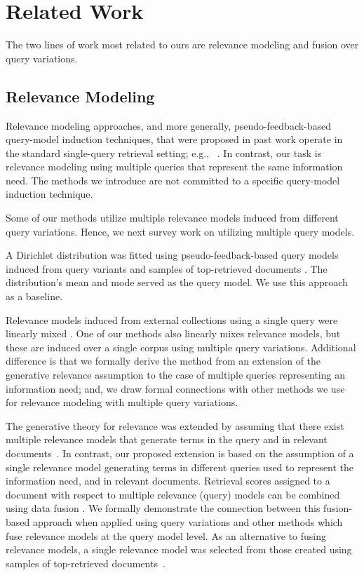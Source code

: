 \section{Related Work}
\label{sec-relwork}
The two lines of work most related to ours are relevance modeling and
fusion over query variations.

\subsection{Relevance Modeling}
Relevance modeling approaches, and more generally,
pseudo-feedback-based query-model induction techniques, that were
proposed in past work operate in the standard single-query retrieval setting; e.g.,
~\cite{Lavrenko+al:02a,Liu+Croft:02a,Lavrenko+Croft:03a,Abdul-Jaleel+al:04a,Wei+Croft:06a,Metzler+Croft:07b,Bendersky+Kurland:08a,Lv+Zhai:10a}.
In contrast, our task is relevance modeling using multiple queries
that represent the same information need.
The methods we introduce are not committed to a specific query-model
induction technique.


Some of our methods utilize multiple relevance models induced from
different query variations.
Hence, we next survey work on utilizing multiple query models.

A Dirichlet distribution was fitted using pseudo-feedback-based query
models induced from query variants and samples of top-retrieved
documents \cite{Collins-Thompson+Callan:07a}.
The distribution's mean and mode served as the query model.
We use this approach as a baseline.

Relevance models induced from external collections using a single
query were linearly mixed \cite{Diaz+Metzler:06a,bmc12-wsdm}.
One of our methods also linearly mixes relevance models, but these
are induced over a single corpus using multiple query variations.
Additional difference is that we formally derive the method from an
extension of the generative relevance assumption to the case of
multiple queries representing an information need; and, we draw
formal connections with other methods
we use for
relevance modeling with multiple query variations.

The generative theory for relevance was extended by assuming that
there exist multiple relevance models that generate terms in the
query and in relevant documents~\cite{Soskin+al:09a}.
In contrast, our proposed extension is based on the assumption of a
single relevance model
generating terms in different queries used
to represent the information need, and in relevant documents.
Retrieval scores assigned to a document with respect to multiple
relevance (query) models can be combined using data fusion \cite{Soskin+al:09a,Xue+Croft:13a}.
We formally demonstrate the connection between this fusion-based
approach when applied using query variations and other methods which
fuse relevance models at the query model level.
As an alternative to fusing relevance models, a single relevance
model was selected from those created using samples of top-retrieved
documents~\cite{Winaver+al:07a}.


